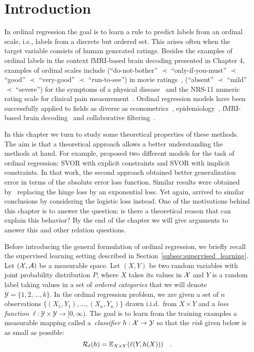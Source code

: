 \section{Introduction}



In ordinal regression the goal is to learn a rule to predict labels from an ordinal scale, i.e., labels from a discrete but ordered set. This arises often when the target variable consists of human generated ratings. Besides the examples of ordinal labels in the context fMRI-based brain decoding presented in Chapter 4, examples of ordinal scales include (``do-not-bother'' $\prec$ ``only-if-you-must'' $\prec$ ``good'' $\prec$ ``very-good'' $\prec$ ``run-to-see'') in movie ratings~\citep{crammer2001pranking},  (``absent'' $\prec$ ``mild'' $\prec$ ``severe'') for the symptoms of a physical disease~\citep{ARMSTRONG01011989} and the NRS-11 numeric rating scale for clinical pain measurement~\citep{PAPR:PAPR3034}. Ordinal regression models have been successfully applied to fields  as diverse as econometrics~\citep{greene1997econometric}, epidemiology~\citep{ananth1997regression}, fMRI-based brain decoding~\citep{doyle2013multivariate} and collaborative filtering~\citep{Rennie}.

In this chapter we turn to study some theoretical properties of these methods. The aim is that a theoretical approach allows a better understanding the methods at hand. For example, \citet{Keerthi2003} proposed two different models for the task of ordinal regression: SVOR with explicit constraints and SVOR with implicit constraints. In that work, the second approach obtained better generalization error in terms of the absolute error loss function. Similar results were obtained by~\citep{lin2006large} replacing the hinge loss by an exponential loss. Yet again, \citep{Rennie} arrived to similar conclusions by considering the logistic loss instead. One of the motivations behind this chapter is to answer the question: is there a theoretical reason that can explain this behavior? By the end of the chapter we will give arguments to answer this and other relation questions.


Before introducing the general formulation of ordinal regression, we briefly recall the supervised learning setting described in Section~\ref{subsec:supervised_learning}. Let $(\mathcal{X}, \mathcal{A})$ be a measurable space. Let $(X, Y)$ be two random variables with joint probability distribution $P$, where $X$ takes its values in $\mathcal{X}$ and $Y$ is a random label taking values in a set of \emph{ordered categories} that we will denote $\mathcal{Y} = \{1, 2, \ldots, k\}$. In the ordinal regression problem, we are given a set of $n$ observations $\{(X_1,
Y_1), \ldots, (X_n, Y_n) \}$ drawn i.i.d.~from $X\times Y$ and a \emph{loss
function} $\ell: \mathcal{Y} \times \mathcal{Y} \rightarrow [0, \infty)$. The goal is to learn from the training examples a measurable mapping called a~\emph{classifier} $h: \mathcal{X} \rightarrow \mathcal{Y}$ so that the \emph{risk} given below is as small as possible:
\begin{equation}
\label{eq:l_risk}
\mathcal{R}_{\ell}(h) = \EE_{X \times Y}(\ell(Y, h(X)))\quad.
\end{equation}


